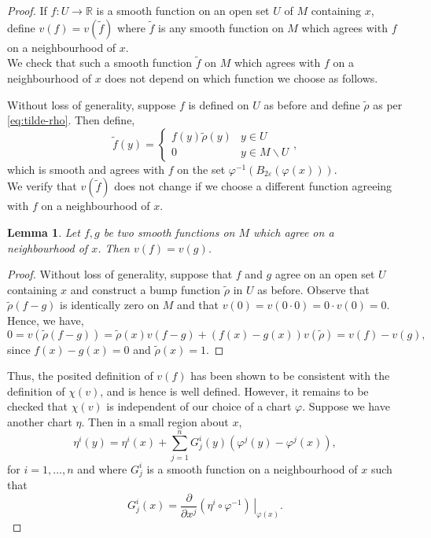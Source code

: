\documentclass[12pt,a4paper]{article}
\numberwithin{equation}{section}
\newtheorem{lemma}{Lemma}[section]
\theoremstyle{definition}
\theoremstyle{remark}
\begin{document}
\begin{proof}
If $f:U\to\mathbb{R}$ is a smooth function on an open set $U$ of $M$ containing $x$, define $v(f)=v(\tilde{f})$ where $\tilde{f}$ is any smooth function on $M$ which agrees with $f$ on a neighbourhood of $x$.\\

We check that such a smooth function $\tilde{f}$ on $M$ which agrees with $f$ on a neighbourhood of $x$ does not depend on which function we choose as follows.

Without loss of generality, suppose $f$ is defined on $U$ as before and define $\tilde{\rho}$ as per \eqref{eq:tilde-rho}. Then define,
\begin{equation}
\tilde{f}(y)=\begin{cases}
f(y)\tilde{\rho}(y) & y\in U\\
0 & y\in M\backslash U
\end{cases},
\end{equation}
which is smooth and agrees with $f$ on the set $\varphi^{-1}\left( B_{2\varepsilon}(\varphi(x)) \right)$.\\

We verify that $v(\tilde{f})$ does not change if we choose a different function agreeing with $f$ on a neighbourhood of $x$.
\begin{lemma}
Let $f,g$ be two smooth functions on $M$ which agree on a neighbourhood of $x$. Then $v(f)=v(g)$.
\end{lemma}
\begin{proof}
Without loss of generality, suppose that $f$ and $g$ agree on an open set $U$ containing $x$ and construct a bump function $\tilde{\rho}$ in $U$ as before. Observe that $\tilde{\rho}(f-g)$ is identically zero on $M$ and that $v(0)=v(0\cdot 0)=0\cdot v(0)=0$. Hence, we have,
\[
0=v(\tilde{\rho}(f-g))=\tilde{\rho}(x)v(f-g)+(f(x)-g(x))v(\tilde{\rho})=v(f)-v(g),
\]
since $f(x)-g(x)=0$ and $\tilde{\rho}(x)=1$.
\end{proof}
Thus, the posited definition of $v(f)$ has been shown to be consistent with the definition of $\chi(v)$, and is hence is well defined. However, it remains to be checked that $\chi(v)$ is independent of our choice of a chart $\varphi$. Suppose we have another chart $\eta$. Then in a small region about $x$,
\begin{equation}
\eta^i(y)=\eta^i(x)+\sum_{j=1}^nG^i_j(y)\left( \varphi^j(y)-\varphi^j(x) \right),
\end{equation} 
for $i=1,\ldots,n$ and where $G^i_j$ is a smooth function on a neighbourhood of $x$ such that
\[
G^i_j(x)=\frac{\partial}{\partial x^j}\left.\left(\eta^i\circ\varphi^{-1}\right)\,\right\rvert_{\varphi(x)}.
\]


\end{proof}
\end{document}
